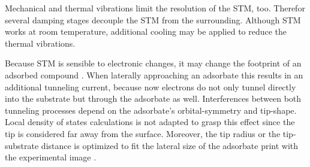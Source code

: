 Mechanical and thermal vibrations limit the resolution of the STM, too. Therefor several damping stages decouple the STM from the surrounding. Although STM works at room temperature, additional cooling may be applied to reduce the thermal vibrations.

Because STM is sensible to electronic changes, it may change the footprint of an adsorbed compound \cite{sautet_interpretation_1992}. When laterally approaching an adsorbate this results in an additional tunneling current, because now electrons do not only tunnel directly into the substrate but through the adsorbate as well. Interferences between both tunneling processes depend on the adsorbate's orbital-symmetry and tip-shape. Local density of states calculations \cite{tersoff_theory_1985, lang_theory_1986, eigler_imaging_1991} is not adapted to grasp this effect since the tip is considered far away from the surface. Moreover, the tip radius or the tip-substrate distance is optimized to fit the lateral size of the adsorbate print with the experimental image \cite{tersoff_theory_1985, eigler_imaging_1991}.